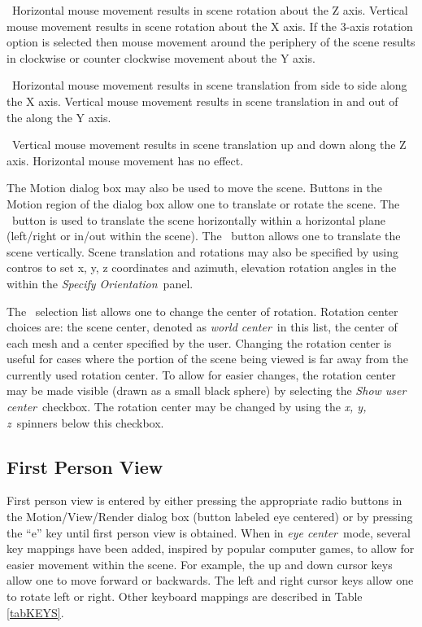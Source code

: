 \documentclass[11pt,twoside]{book}
\newcommand{\frameit}[1]{\fbox{\tt #1}}
\newcommand{\parma}{.75}
\newcommand{\parmb}{.5}
\newcommand{\parmc}{0.25}
\newcommand{\blist}{
\begin{list}
{}{
\setlength{\leftmargin}{\parma in}
\setlength{\labelwidth}{\parmb in}
\setlength{\labelsep}{\parmc in}
\setlength{\listparindent}{0.3in}
\setlength{\topsep}{.3in}
\setlength{\parsep}{.0in}
}}
\newcommand{\elist}{\end{list}}
\newcommand{\hitem}[1]{\item[{\bf #1} \hfill]}
\begin{document}
\blist

\hitem{no modifier keys}\ Horizontal mouse movement results in
scene rotation about the Z axis. Vertical mouse movement results
in scene rotation about the X axis.  If the 3-axis rotation option
is selected then mouse movement around the periphery of the scene
results in clockwise or counter clockwise movement about the Y
axis.

\hitem{CTRL key depressed}\ Horizontal mouse movement results in
scene translation from side to side along the X axis. Vertical
mouse movement results in scene translation in and out of the
along the Y axis.

\hitem{ALT key depressed}\ Vertical mouse movement results in scene
translation up and down along the Z axis. Horizontal mouse
movement has no effect.

\elist


The Motion dialog box may also be used to move the
scene. Buttons in the Motion
region of the dialog box allow one to translate or rotate the scene. The
\frameit{Horizontal}\ button is used to translate the scene
horizontally within a horizontal plane (left/right or in/out within the scene).  The
\frameit{Vertical}\ button allows one to translate the scene vertically.
Scene translation and rotations may also be specified by using contros to set x, y, z
coordinates and azimuth, elevation rotation angles in the within the {\em Specify Orientation}\ panel.

The \frameit{Rotate about}\ selection list allows one to change the center of rotation.
Rotation center choices are: the scene center, denoted as {\em world center}\ in this list, the center of each mesh and a center specified by the user.
Changing the rotation center is useful for cases where the portion of the scene being viewed is far away from the currently used rotation center.
To allow for easier changes, the rotation center may be made visible (drawn as a small black sphere) by selecting the {\em Show user center}\ checkbox.  The rotation center may be changed by using the
{\em x, y, z}\ spinners below this checkbox.

\subsection{First Person View}
\label{section:eyeview}
First person view is entered by either pressing the appropriate
radio buttons in the Motion/View/Render dialog box (button
labeled eye centered) or by pressing the ``e'' key until first
person view is obtained. When in {\em eye center}\ mode, several
key mappings have been added, inspired by popular computer games,
to allow for easier movement within the scene. For example, the up
and down cursor keys allow one to move forward or backwards.  The
left and right cursor keys allow one to rotate left or right.
Other keyboard mappings are described in Table \ref{tabKEYS}.
\end{document}
